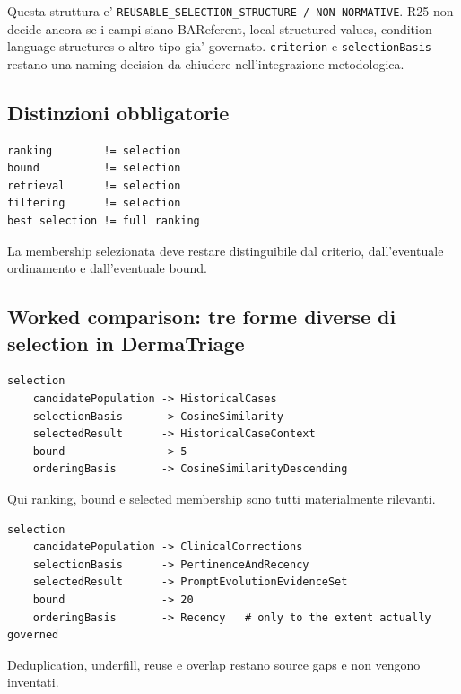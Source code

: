 \documentclass[11pt,a4paper]{article}
\begin{document}
\begin{ddtaopen}[title={Typing non ancora congelato}]
Questa struttura e' \texttt{REUSABLE\_SELECTION\_STRUCTURE / NON-NORMATIVE}. R25 non decide ancora se i campi siano BAReferent, local structured values, condition-language structures o altro tipo gia' governato. \texttt{criterion} e \texttt{selectionBasis} restano una naming decision da chiudere nell'integrazione metodologica.
\end{ddtaopen}

\subsection{Distinzioni obbligatorie}
\begin{lstlisting}
ranking        != selection
bound          != selection
retrieval      != selection
filtering      != selection
best selection != full ranking
\end{lstlisting}

La membership selezionata deve restare distinguibile dal criterio, dall'eventuale ordinamento e dall'eventuale bound.


\subsection{Worked comparison: tre forme diverse di selection in DermaTriage}
\begin{ddtaexample}[title={FR-18 - ranked top-5 historical cases}]
\begin{lstlisting}
selection
    candidatePopulation -> HistoricalCases
    selectionBasis      -> CosineSimilarity
    selectedResult      -> HistoricalCaseContext
    bound               -> 5
    orderingBasis       -> CosineSimilarityDescending
\end{lstlisting}
Qui ranking, bound e selected membership sono tutti materialmente rilevanti.
\end{ddtaexample}

\begin{ddtaexample}[title={FR-06 - recent-N pertinent corrections}]
\begin{lstlisting}
selection
    candidatePopulation -> ClinicalCorrections
    selectionBasis      -> PertinenceAndRecency
    selectedResult      -> PromptEvolutionEvidenceSet
    bound               -> 20
    orderingBasis       -> Recency   # only to the extent actually governed
\end{lstlisting}
Deduplication, underfill, reuse e overlap restano source gaps e non vengono inventati.
\end{ddtaexample}
\end{document}
